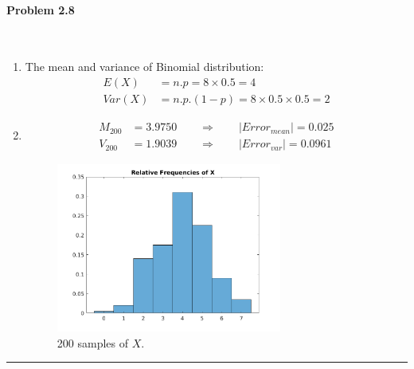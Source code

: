 \documentclass[12pt, letterpaper]{scrartcl}
\begin{document}
\paragraph*{Problem 2.8} \hfill\\
\begin{enumerate}[((a))]
    \item The mean and variance of Binomial distribution:
    \begin{align*}
        E(X)&=n.p=8\times0.5=4\\
        Var(X)&=n.p.(1-p)=8\times0.5\times0.5=2
    \end{align*}
    \item
    \begin{align*}
        M_{200}&=3.9750 \qquad\Rightarrow\qquad |Error_{mean}|=0.025\\
        V_{200}&=1.9039 \qquad\Rightarrow\qquad |Error_{var}|=0.0961
    \end{align*}
    \begin{figure}[h!]
        \centering
        \includegraphics[width=0.7\textwidth]{hw2_figures/2.8.png}
        \caption{200 samples of $X$.}
    \end{figure}
    \clearpage
\end{enumerate}
\hrule
\end{document}
